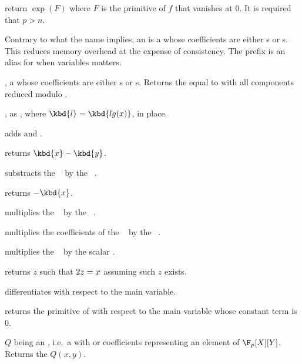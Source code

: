 return $\exp(F)$
where $F$ is the primitive of $f$ that vanishes at $0$.
It is required that $p>n$.




Contrary to what the name implies, an  is a  whose
coefficients are either s or s. This reduces memory
overhead at the expense of consistency. The prefix  is an
alias for  when variables matters.

,  a  whose coefficients are
either s or s. Returns the  equal to  with
all components reduced modulo .

, as , where
$\kbd{l} = \kbd{lg(x)}$, in place.

 adds  and .

 returns $\kbd{x}-\kbd{y}$.

 substracts the ~
by the ~.

 returns $-\kbd{x}$.

 multiplies the ~
by the ~.

 multiplies the coefficients of the
~ by the ~.

 multiplies the ~
by the scalar .

 returns $z$ such that $2\*z = x$
assuming such $z$ exists.

 differentiates  with respect to
the main variable.

 returns the primitive of  with
respect to the main variable whose constant term is $0$.

 $Q$ being an ,
i.e.~a  with  or  coefficients representing an
element of $\F_p[X][Y]$. Returns the  $Q(x,y)$.

